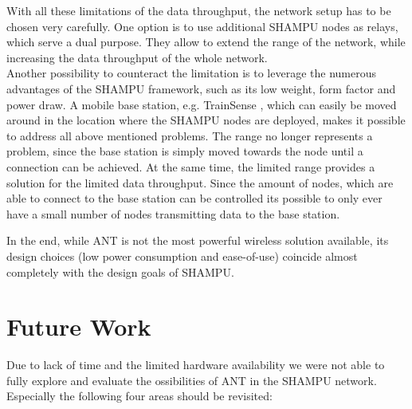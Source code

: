With all these limitations of the data throughput, the network setup has to be chosen very carefully. One option is to use additional SHAMPU nodes as relays, which serve a dual purpose. They allow to extend the range of the network, while increasing the data throughput of the whole network.\\ Another possibility to counteract the limitation is to leverage the numerous advantages of the SHAMPU framework, such as its low weight, form factor and power draw. A mobile base station, e.g. TrainSense \cite{smeets2013trainsense}, which can easily be moved around in the location where the SHAMPU nodes are deployed, makes it possible to address all above mentioned problems. The range no longer represents a problem, since the base station is simply moved towards the node until a connection can be achieved. At the same time, the limited range provides a solution for the limited data throughput. Since the amount of nodes, which are able to connect to the base station can be controlled its possible to only ever have a small number of nodes transmitting data to the base station.

In the end, while ANT is not the most powerful wireless solution available, its design choices (low power consumption and ease-of-use) coincide almost completely with the design goals of SHAMPU.
\newpage
\section{Future Work}
\label{sec:future}
Due to lack of time and the limited hardware availability we were not able to fully explore and evaluate the ossibilities of ANT in the SHAMPU network. Especially the following four areas should be revisited:

